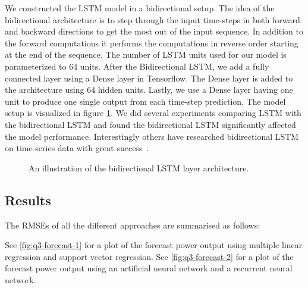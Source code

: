 \documentclass[11pt]{article}
\begin{document}
We constructed the LSTM model in a bidirectional setup. The idea of the bidirectional architecture is to step through the input time-steps in both forward and backward directions to get the most out of the input sequence. In addition to the forward computations it performs the computations in reverse order starting at the end of the sequence. The number of LSTM units used for our model is parameterized to 64 units. After the Bidirectional LSTM, we add a fully connected layer using a Dense layer in Tensorflow. The Dense layer is added to the architecture using 64 hidden units. Lastly, we use a Dense layer having one unit to produce one single output from each time-step prediction. The model setup is visualized in figure \ref{fig:RNN-bidirectional}. We did several experiments comparing LSTM with the bidirectional LSTM and found the bidirectional LSTM significantly affected the model performance. Interestingly others have researched bidirectional LSTM on time-series data with great success~\cite{siami-namini-et-al}.

\begin{figure}
  \centering
  \caption{An illustration of the bidirectional LSTM layer architecture.}
  \label{fig:RNN-bidirectional}
\end{figure}


\subsection*{Results}

The RMSEs of all the different approaches are summarised as follows:
\begin{center}
\end{center}

See \cref{fig:q3-forecast-1} for a plot of the forecast power output using multiple linear regression and support vector regression.
See \cref{fig:q3-forecast-2} for a plot of the forecast power output using an artificial neural network and a recurrent neural network.
\end{document}
